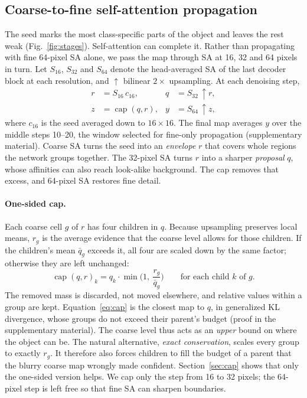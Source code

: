 \subsection{Coarse-to-fine self-attention propagation}
\label{sec:method_c2f}
The seed marks the most class-specific parts of the object and leaves the rest weak (Fig.~\ref{fig:stages}). Self-attention can complete it. Rather than propagating with fine 64-pixel SA alone, we pass the map through SA at 16, 32 and 64 pixels in turn. Let $S_{16}$, $S_{32}$ and $S_{64}$ denote the head-averaged SA of the last decoder block at each resolution, and $\uparrow$ bilinear $2\times$ upsampling. At each denoising step,
\begin{equation}
\begin{aligned}
r&=S_{16}\,c_{16}, & q&=S_{32}\,{\uparrow}r,\\
z&=\operatorname{cap}(q,r), & y&=S_{64}\,{\uparrow}z,
\end{aligned}
\label{eq:c2f}
\end{equation}
where $c_{16}$ is the seed averaged down to $16\times16$. The final map averages $y$ over the middle steps 10--20, the window selected for fine-only propagation (supplementary material). Coarse SA turns the seed into an \emph{envelope} $r$ that covers whole regions the network groups together. The 32-pixel SA turns $r$ into a sharper \emph{proposal} $q$, whose affinities can also reach look-alike background. The cap removes that excess, and 64-pixel SA restores fine detail.

\paragraph{One-sided cap.} Each coarse cell $g$ of $r$ has four children in $q$. Because upsampling preserves local means, $r_g$ is the average evidence that the coarse level allows for those children. If the children's mean $\bar q_g$ exceeds it, all four are scaled down by the same factor; otherwise they are left unchanged:
\begin{equation}
\operatorname{cap}(q,r)_k=q_k\cdot\min\!\Big(1,\ \frac{r_g}{\bar q_g}\Big)\qquad\text{for each child }k\text{ of }g.
\label{eq:cap}
\end{equation}
The removed mass is discarded, not moved elsewhere, and relative values within a group are kept. Equation~\eqref{eq:cap} is the closest map to $q$, in generalized KL divergence, whose groups do not exceed their parent's budget (proof in the supplementary material). The coarse level thus acts as an \emph{upper} bound on where the object can be. The natural alternative, \emph{exact conservation}, scales every group to exactly $r_g$. It therefore also forces children to fill the budget of a parent that the blurry coarse map wrongly made confident. Section~\ref{sec:cap} shows that only the one-sided version helps. We cap only the step from 16 to 32 pixels; the 64-pixel step is left free so that fine SA can sharpen boundaries.

